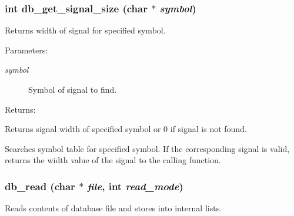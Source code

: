 \subsubsection{\setlength{\rightskip}{0pt plus 5cm}int db\_\-get\_\-signal\_\-size (char $\ast$ {\em symbol})}\label{db_8c_a34}


Returns width of signal for specified symbol.

\begin{Desc}
\item[Parameters: ]\par
\begin{description}
\item[{\em 
symbol}]Symbol of signal to find.\end{description}
\end{Desc}
\begin{Desc}
\item[Returns: ]\par
Returns signal width of specified symbol or 0 if signal is not found.\end{Desc}
Searches symbol table for specified symbol. If the corresponding signal is valid, returns the width value of the signal to the calling function. 
\subsubsection{ db\_\-read (char $\ast$ {\em file}, int {\em read\_\-mode})}\label{db_8c_a14}


Reads contents of database file and stores into internal lists.

